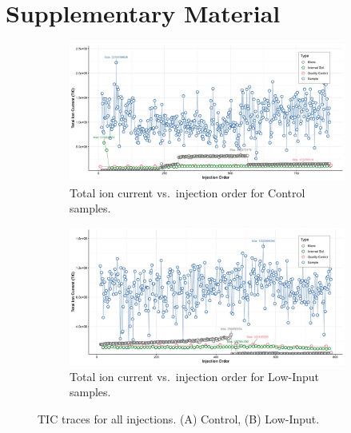 \documentclass[10pt,letterpaper]{article}
\newcommand{\beginsupplement}{%
  \setcounter{table}{0}%
  \renewcommand{\thetable}{S\arabic{table}}%
  \setcounter{figure}{0}%
  \renewcommand{\thefigure}{S\arabic{figure}}}
\begin{document}
\section*{Supplementary Material}
\beginsupplement


\begin{figure}[htp]
  \centering

  \begin{subfigure}[t]{\textwidth}
    \includegraphics[width=\linewidth]{fig/supp/SuppFig_1A_TIC_Control}
    \caption{Total ion current vs.\ injection order for Control samples.}
    \label{fig:S1A}
  \end{subfigure}

  \vspace{1em}

  \begin{subfigure}[t]{\textwidth}
    \includegraphics[width=\linewidth]{fig/supp/SuppFig_1B_TIC_LowInput.png}
    \caption{Total ion current vs.\ injection order for Low-Input samples.}
    \label{fig:S1B}
  \end{subfigure}

  \caption{TIC traces for all injections.  (A) Control, (B) Low-Input.}
  \label{fig:S1}
\end{figure}
\end{document}
